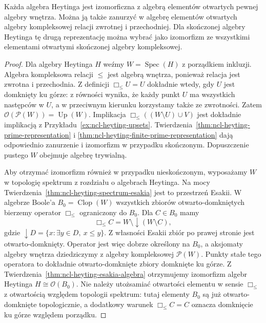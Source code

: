 \begin{wniosek}
\label{cor:ncl-modal-heyting-open-representation}
Każda algebra Heytinga jest izomorficzna
z algebrą elementów otwartych pewnej algebry
wnętrza. Można ją także zanurzyć w algebrę
elementów otwartych algebry kompleksowej
relacji zwrotnej i przechodniej.
Dla skończonej algebry Heytinga tę drugą
reprezentację można wybrać jako izomorfizm
ze wszystkimi elementami otwartymi skończonej
algebry kompleksowej.
\end{wniosek}
\begin{proof}
Dla algebry Heytinga $H$ weźmy
$W=\operatorname{Spec}(H)$ z porządkiem inkluzji.
Algebra kompleksowa relacji $\leq$ jest algebrą
wnętrza, ponieważ relacja jest zwrotna
i przechodnia. Z definicji
$\Box_{\leq}U=U$ dokładnie wtedy, gdy $U$
jest domknięty ku górze: z równości wynika,
że każdy punkt $U$ ma wszystkich następców
w $U$, a w przeciwnym kierunku korzystamy
także ze zwrotności.
Zatem $\mathcal O(\mathcal P(W))=\operatorname{Up}(W)$.
Implikacja $\Box_{\leq}((W\setminus U)\cup V)$
jest dokładnie implikacją z
Przykładu~\ref{ex:ncl-heyting-upsets}.
Twierdzenia~\ref{thm:ncl-heyting-prime-representation}
i \ref{thm:ncl-heyting-finite-prime-representation}
dają odpowiednio zanurzenie i izomorfizm
w przypadku skończonym.
Dopuszczenie pustego $W$ obejmuje algebrę trywialną.

Aby otrzymać izomorfizm również w przypadku
nieskończonym, wyposażamy $W$ w topologię
spektrum z rozdziału o algebrach Heytinga.
Na mocy Twierdzenia~\ref{thm:ncl-heyting-spectrum-esakia}
jest to przestrzeń Esakii. W algebrze
Boole'a $B_0=\operatorname{Clop}(W)$ wszystkich
zbiorów otwarto-domkniętych bierzemy operator
$\Box_{\leq}$ ograniczony do $B_0$.
Dla $C\in B_0$ mamy
\[
 \Box_{\leq}C=W\setminus\downarrow(W\setminus C),
\]
gdzie $\downarrow D=\{x:\exists y\in D,\ x\leq y\}$.
Z własności Esakii zbiór po prawej stronie
jest otwarto-domknięty. Operator jest więc
dobrze określony na $B_0$, a aksjomaty
algebry wnętrza dziedziczymy z algebry
kompleksowej $\mathcal P(W)$.
Punkty stałe tego operatora to dokładnie
otwarto-domknięte zbiory domknięte ku górze.
Z Twierdzenia~\ref{thm:ncl-heyting-esakia-algebra}
otrzymujemy izomorfizm algebr Heytinga
$H\cong\mathcal O(B_0)$.
Nie należy utożsamiać otwartości elementu
w sensie $\Box_{\leq}$ z otwartością względem
topologii spektrum: tutaj elementy $B_0$
są już otwarto-domknięte topologicznie,
a dodatkowy warunek $\Box_{\leq}C=C$
oznacza domknięcie ku górze względem porządku.
\end{proof}

